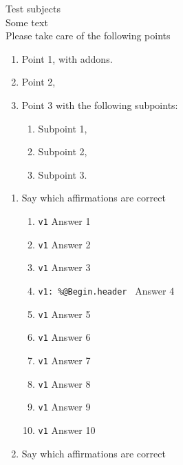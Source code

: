 \documentclass{article}%
\begin{document}
Test subjects\\

Some text\\
Please take care of the following points
\begin{enumerate}
\item Point 1,
with addons.
\item Point 2,
\item Point 3 with the following subpoints:
	\begin{enumerate}
	\item Subpoint 1, %
	\item Subpoint 2,
	\item Subpoint 3.
\end{enumerate}
\end{enumerate}
\begin{enumerate}

Given the code
\begin{lstlisting}
%\newtheorem{theorem}{Theorem}
%\newtheorem{acknowledgement}[theorem]{Acknowledgement}
%\newtheorem{algorithm}[theorem]{Algorithm}
%\newtheorem{axiom}[theorem]{Axiom}
%\newtheorem{case}[theorem]{Case}
%\newtheorem{claim}[theorem]{Claim}
%\newtheorem{conclusion}[theorem]{Conclusion}
%\newtheorem{condition}[theorem]{Condition}
%\newtheorem{conjecture}[theorem]{Conjecture}
\end{lstlisting}

\item Say which affirmations are correct
\begin{enumerate}
\item \verb+v1+ Answer 1
\item \verb+v1+ Answer 2
\item \verb+v1+ Answer 3
\item \verb+v1: %@Begin.header + Answer 4 %
\item \verb+v1+ Answer 5
\item \verb+v1+ Answer 6
\item \verb+v1+ Answer 7
\item \verb+v1+ Answer 8		%
\item \verb+v1+ Answer 9
\item \verb+v1+ Answer 10
\end{enumerate}
\item Say which affirmations are correct
\begin{enumerate}	


\end{enumerate}
\end{enumerate}
\end{document}
